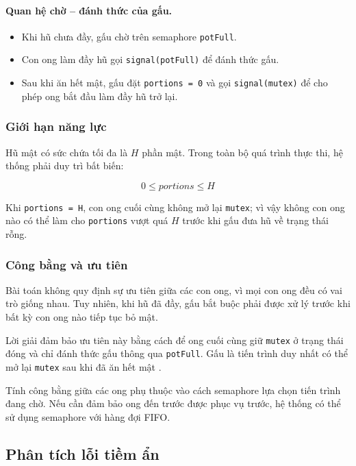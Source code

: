 \paragraph{Quan hệ chờ -- đánh thức của gấu.}

\begin{itemize}
\item Khi hũ chưa đầy, gấu chờ trên semaphore \texttt{potFull}.
\item Con ong làm đầy hũ gọi \texttt{signal(potFull)} để đánh thức
gấu.
\item Sau khi ăn hết mật, gấu đặt \texttt{portions = 0} và gọi
\texttt{signal(mutex)} để cho phép ong bắt đầu làm đầy hũ trở lại.
\end{itemize}

\subsubsection*{Giới hạn năng lực}

Hũ mật có sức chứa tối đa là $H$ phần mật. Trong toàn bộ quá trình thực
thi, hệ thống phải duy trì bất biến:

\[
0 \leq portions \leq H
\]

Khi \texttt{portions = H}, con ong cuối cùng không mở lại
\texttt{mutex}; vì vậy không con ong nào có thể làm cho
\texttt{portions} vượt quá $H$ trước khi gấu đưa hũ về trạng thái rỗng.

\subsubsection*{Công bằng và ưu tiên}

Bài toán không quy định sự ưu tiên giữa các con ong, vì mọi con ong đều
có vai trò giống nhau. Tuy nhiên, khi hũ đã đầy, gấu bắt buộc phải được
xử lý trước khi bất kỳ con ong nào tiếp tục bỏ mật.

Lời giải đảm bảo ưu tiên này bằng cách để ong cuối cùng giữ
\texttt{mutex} ở trạng thái đóng và chỉ đánh thức gấu thông qua
\texttt{potFull}. Gấu là tiến trình duy nhất có thể mở lại
\texttt{mutex} sau khi đã ăn hết mật
\cite[Slides~13--15]{kerola2012}.

Tính công bằng giữa các ong phụ thuộc vào cách semaphore lựa chọn tiến
trình đang chờ. Nếu cần đảm bảo ong đến trước được phục vụ trước, hệ
thống có thể sử dụng semaphore với hàng đợi FIFO.


\subsection{Phân tích lỗi tiềm ẩn}


